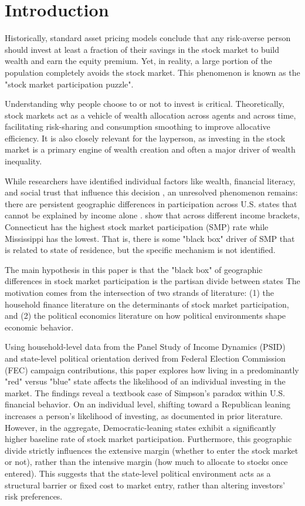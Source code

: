 
\section{Introduction}
\label{sec:intro}

Historically, standard asset pricing models conclude that any risk-averse person should invest at least a fraction of their savings in the stock market to build wealth and earn the equity premium. Yet, in reality, a large portion of the population completely avoids the stock market. This phenomenon is known as the "stock market participation puzzle". 

Understanding why people choose to or not to invest is critical. Theoretically, stock markets act as a vehicle of wealth allocation across agents and across time, facilitating risk-sharing and consumption smoothing to improve allocative efficiency. It is also closely relevant for the layperson, as investing in the stock market is a primary engine of wealth creation and often a major driver of wealth inequality. 

While researchers have identified individual factors like wealth, financial literacy, and social trust that influence this decision \citep{guiso2008, vanrooij2011, bu2022}, an unresolved phenomenon remains: there are persistent geographic differences in participation across U.S. states that cannot be explained by income alone \citep{chien2017}. \citet{chien2017} show that across different income brackets, Connecticut has the highest stock market participation (SMP) rate while Mississippi has the lowest. That is, there is some "black box" driver of SMP that is related to state of residence, but the specific mechanism is not identified.

The main hypothesis in this paper is that the "black box" of geographic differences in stock market participation is the partisan divide between states The motivation comes from the intersection of two strands of literature: (1) the household finance literature on the determinants of stock market participation, and (2) the political economics literature on how political environments shape economic behavior.

Using household-level data from the Panel Study of Income Dynamics (PSID) and state-level political orientation derived from Federal Election Commission (FEC) campaign contributions, this paper explores how living in a predominantly "red" versus "blue" state affects the likelihood of an individual investing in the market.  The findings reveal a textbook case of Simpson's paradox within U.S. financial behavior. On an individual level, shifting toward a Republican leaning increases a person's likelihood of investing, as documented in prior literature. However, in the aggregate, Democratic-leaning states exhibit a significantly higher baseline rate of stock market participation. Furthermore, this geographic divide strictly influences the extensive margin (whether to enter the stock market or not), rather than the intensive margin (how much to allocate to stocks once entered). This suggests that the state-level political environment acts as a structural barrier or fixed cost to market entry, rather than altering investors' risk preferences.

